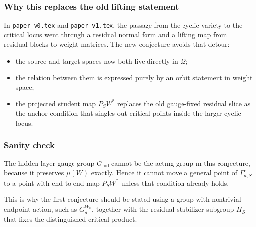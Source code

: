 \documentclass{article}
\theoremstyle{definition}
\begin{document}
\subsubsection*{Why this replaces the old lifting statement}

In \texttt{paper\_v0.tex} and \texttt{paper\_v1.tex}, the passage from the cyclic variety to the critical locus went through a residual normal form and a lifting map from residual blocks to weight matrices. The new conjecture avoids that detour:
\begin{itemize}
\item the source and target spaces now both live directly in $\Omega$;
\item the relation between them is expressed purely by an orbit statement in weight space;
\item the projected student map $P_SW^\ast$ replaces the old gauge-fixed residual slice as the anchor condition that singles out critical points inside the larger cyclic locus.
\end{itemize}

\subsubsection*{Sanity check}

The hidden-layer gauge group $G_{\mathrm{hid}}$ cannot be the acting group in this conjecture, because it preserves $\mu(W)$ exactly. Hence it cannot move a general point of $\Gamma_{d,S}^r$ to a point with end-to-end map $P_SW^\ast$ unless that condition already holds.

This is why the first conjecture should be stated using a group with nontrivial endpoint action, such as $G_d^{W_0}$, together with the residual stabilizer subgroup $H_S$ that fixes the distinguished critical product.
\end{document}

